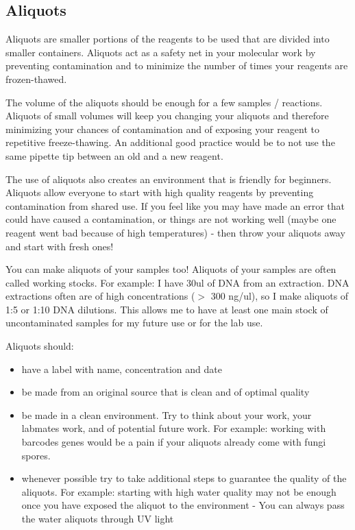 \documentclass[11pt, oneside]{article}
\begin{document}
	\newpage

	\subsection{Aliquots}

		Aliquots are smaller portions of the reagents to be used that are divided into smaller containers. Aliquots act as a safety net in your molecular 			work by preventing contamination and to minimize the number of times your reagents are frozen-thawed. 

		The volume of the aliquots should be enough for a few samples / reactions. Aliquots of small volumes will keep you changing your aliquots and 		therefore minimizing your chances of contamination and of exposing your reagent to repetitive freeze-thawing. An additional good practice would 		be to not use the same pipette tip between an old and a new reagent. 

		The use of aliquots also creates an environment that is friendly for beginners. Aliquots allow everyone to start with high quality reagents by 			preventing contamination from shared use. If you feel like you may have made an error that could have caused a contamination, or things are 			not working well (maybe one reagent went bad because of high temperatures) - then throw your aliquots away and start with fresh ones! 

		You can make aliquots of your samples too! Aliquots of your samples are often called working stocks. For example: I have 30ul of DNA from an 		extraction. DNA extractions often are of high concentrations ($>$ 300 ng/ul), so I make aliquots of 1:5 or 1:10 DNA dilutions. This allows me to 			have at least one main stock of uncontaminated samples for my future use or for the lab use. 

		\vspace{3mm}

		\hspace{1in} Aliquots should:

		\begin{itemize}
			\item have a label with name, concentration and date
			\item be made from an original source that is clean and of optimal quality
			\item be made in a clean environment. Try to think about your work, your labmates work, and of potential future work. For example: working 			with barcodes genes would be a pain if your aliquots already come with fungi spores. 
			\item whenever possible try to take additional steps to guarantee the quality of the aliquots. For example: starting with high water quality 				may not be enough once you have exposed the aliquot to the environment - You can always pass the water aliquots through UV light
		\end{itemize}
\end{document}
